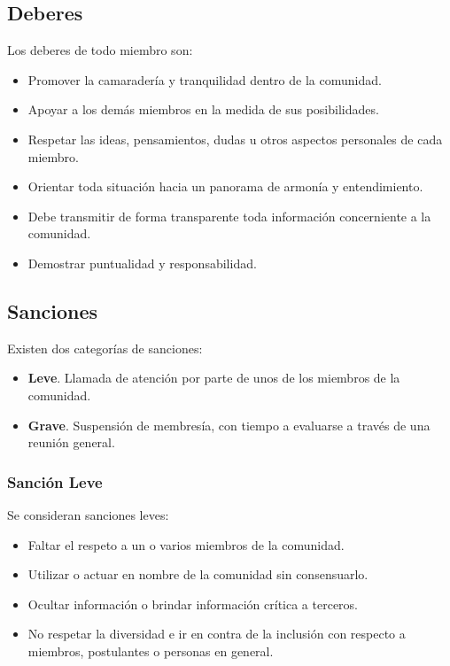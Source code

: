 \documentclass[12pt, letterpaper]{article}
\begin{document}
    \subsection{Deberes}
    Los deberes de todo miembro son:
    \begin{itemize}
        \item Promover la camaradería y tranquilidad dentro de la comunidad.
        \item Apoyar a los demás miembros en la medida de sus posibilidades.
        \item Respetar las ideas, pensamientos, dudas u otros aspectos 
        personales de cada miembro.
        \item Orientar toda situación hacia un panorama de armonía y 
        entendimiento.
        \item Debe transmitir de forma transparente toda información 
        concerniente a la comunidad.
        \item Demostrar puntualidad y responsabilidad.
    \end{itemize}
    
    \subsection{Sanciones}
    Existen dos categorías de sanciones:
    \begin{itemize}
        \item \textbf{Leve}. Llamada de atención por parte de unos de los
        miembros de la comunidad.
        \item \textbf{Grave}. Suspensión de membresía, con tiempo a evaluarse a 
        través de una reunión general.
    \end{itemize}

    \subsubsection{Sanción Leve}
    Se consideran sanciones leves:
    \begin{itemize}
        \item Faltar el respeto a un o varios miembros de la comunidad.
        \item Utilizar o actuar en nombre de la comunidad sin consensuarlo.
        \item Ocultar información o brindar información crítica a terceros.
        \item No respetar la diversidad e ir en contra de la inclusión con 
        respecto a miembros, postulantes o personas en general.
    \end{itemize}
\end{document}
